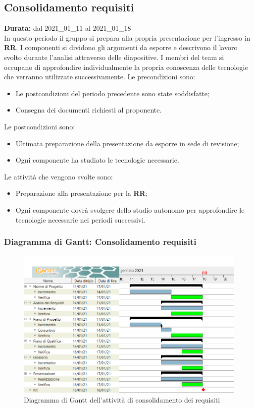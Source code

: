\subsection{Consolidamento requisiti}
\label{consolidamento_requisiti}
\textbf{Durata:} dal 2021\_01\_11 al 2021\_01\_18\\
In questo periodo il gruppo si prepara alla propria presentazione per l'ingresso in \textbf{RR}.
I componenti si dividono gli argomenti da esporre e descrivono il lavoro svolto durante l'analisi attraverso delle diapositive.
I membri del team si occupano di approfondire individualmente la propria conoscenza delle tecnologie che verranno utilizzate successivamente.
Le precondizioni sono:
\begin{itemize}
    \item Le postcondizioni del periodo precedente sono state soddisfatte;
    \item Consegna dei documenti richiesti al proponente.
\end{itemize}
Le postcondizioni sono:
\begin{itemize}
    \item Ultimata preparazione della presentazione da esporre in sede di revisione;
    \item Ogni componente ha studiato le tecnologie necessarie.
\end{itemize}
Le attività che vengono svolte sono:
\begin{itemize}
    \item Preparazione alla presentazione per la \textbf{RR};
    \item Ogni componente dovrà svolgere dello studio autonomo per approfondire le tecnologie necessarie nei periodi successivi.  
\end{itemize}
\newpage
\subsubsection{Diagramma di Gantt: Consolidamento requisiti}
\begin{figure}[ht]
    \centering
    \includegraphics[width=\textwidth]{Immagini/GanttConsolidamentoRequisiti}
    \caption{Diagramma di Gantt dell'attività di consolidamento dei requisiti}
\end{figure}